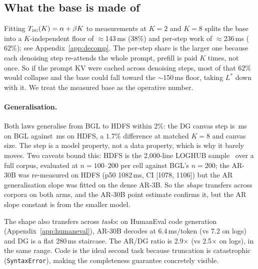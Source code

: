 \subsection{What the base is made of}

Fitting $T_{\textsc{dg}}(K) = \alpha + \beta K$ to measurements at
$K{=}2$ and $K{=}8$ splits the base into a $K$-independent floor of
$\approx$143\,ms ($38\%$) and per-step work of $\approx$236\,ms
($62\%$); see Appendix~\ref{app:decomp}. The per-step share is the
larger one because each denoising step re-attends the whole prompt,
prefill is paid $K$ times, not once. So if the prompt KV were cached
across denoising steps, most of that $62\%$ would collapse and the
base could fall toward the $\sim$150\,ms floor, taking $L^{*}$ down
with it. We treat the measured base as the operative number.

\paragraph{Generalisation.}

Both laws generalise from BGL to HDFS within 2\%: the DG canvas step
is \bglStep\,ms on BGL against \hdfsStep\,ms on HDFS, a $1.7\%$
difference at matched $K{=}8$ and canvas size. The step is a model
property, not a data property, which is why it barely moves. Two
caveats bound this: HDFS is the 2{,}000-line LOGHUB
sample~\cite{loghub} over a full corpus, evaluated at
$n{=}100$--$200$ per cell against BGL's $n{=}200$; the AR-30B was
re-measured on HDFS (p50 1082\,ms, CI [1078, 1106]) but the AR
generalisation slope was fitted on the dense AR-3B. So the
\emph{shape} transfers across corpora on both arms, and the AR-30B
point estimate confirms it, but the AR slope constant is from the
smaller model.

The shape also transfers across \emph{tasks}: on HumanEval code
generation (Appendix~\ref{app:humaneval}), AR-30B decodes at
6.4\,ms/token (vs 7.2 on logs) and DG is a flat 280\,ms staircase. The
AR/DG ratio is 2.9$\times$ (vs 2.5$\times$ on logs), in the same range.
Code is the ideal second task because truncation is catastrophic
(\texttt{SyntaxError}), making the completeness guarantee concretely
visible.

